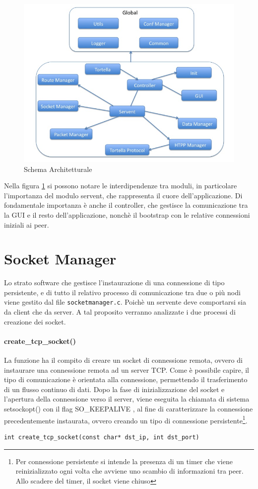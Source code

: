 \begin{figure}[H]
\begin{center}
\includegraphics[scale=0.5]{etc/architectural_overview.png}
\caption{Schema Architetturale}
\label{schemaarchitetturale}
\end{center}
\end{figure}
Nella figura \ref{schemaarchitetturale} si possono notare le interdipendenze tra moduli, in particolare l'importanza del modulo servent, che rappresenta il cuore dell'applicazione. Di fondamentale importanza è anche il controller, che gestisce la comunicazione tra la GUI e il resto dell'applicazione, nonchè il bootstrap con le relative connessioni iniziali ai peer.
\section{Socket Manager}
Lo strato software che gestisce l'instaurazione di una connessione di tipo persistente, e di tutto il relativo processo di comunicazione tra due o più nodi viene gestito dal file \texttt{socketmanager.c}. Poichè un servente deve comportarsi sia da client che da server. A tal proposito verranno analizzate i due processi di creazione dei socket.
\paragraph{create\_tcp\_socket()}
La funzione ha il compito di creare un socket di connessione remota, ovvero di instaurare una connessione remota ad un server TCP. Come è possibile capire, il tipo di comunicazione è orientata alla connessione, permettendo il trasferimento di un flusso continuo di dati.
Dopo la fase di inizializzazione del socket e l'apertura della connessione verso il server, viene eseguita la chiamata di sistema setsockopt() con il flag SO\_KEEPALIVE , al fine di caratterizzare la connessione precedentemente instaurata, ovvero creando un tipo di connessione persistente\footnote{Per connessione persistente si intende la presenza di un timer che viene reinizializzato ogni volta che avviene uno scambio di informazioni tra peer. Allo scadere del timer, il socket viene chiuso}.
\begin{lstlisting}
int create_tcp_socket(const char* dst_ip, int dst_port)
\end{lstlisting}
